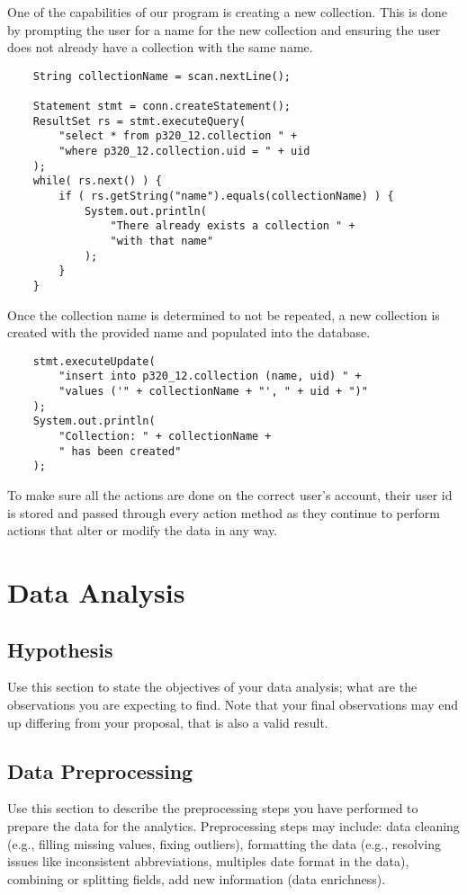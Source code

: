 \documentclass[12pt]{article}
\begin{document}
    One of the capabilities of our program is creating a new collection.
    This is done by prompting the user for a name for the new collection
    and ensuring the user does not already have a collection with the same
    name.
    \begin{lstlisting}
    String collectionName = scan.nextLine();

    Statement stmt = conn.createStatement();
    ResultSet rs = stmt.executeQuery(
        "select * from p320_12.collection " +
        "where p320_12.collection.uid = " + uid
    );
    while( rs.next() ) {
        if ( rs.getString("name").equals(collectionName) ) {
            System.out.println(
                "There already exists a collection " +
                "with that name"
            );
        }
    }
    \end{lstlisting}
    Once the collection name is determined to not be repeated, a new collection
    is created with the provided name and populated into the database.
    \begin{lstlisting}
    stmt.executeUpdate(
        "insert into p320_12.collection (name, uid) " +
        "values ('" + collectionName + "', " + uid + ")"
    );
    System.out.println(
        "Collection: " + collectionName +
        " has been created"
    );
    \end{lstlisting}
    To make sure all the actions are done on the correct user's account, their
    user id is stored and passed through every action method as they continue to perform
    actions that alter or modify the data in any way.



    \section{Data Analysis}

    
    
    
    \subsection{Hypothesis}
    Use this section to state the objectives of your data analysis; what are the observations you are expecting to find. Note that your final
    observations may end up differing from your proposal, that is also a valid result.
    \subsection{Data Preprocessing}
    Use this section to describe the preprocessing steps you have performed to prepare the data for the analytics. Preprocessing steps may include: data cleaning (e.g., filling missing values, fixing outliers), formatting the data (e.g., resolving issues like inconsistent abbreviations, multiples date format in the data), combining or splitting fields, add new information (data enrichness).
\end{document}

